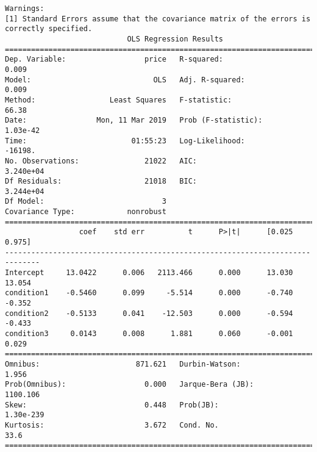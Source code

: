 \documentclass[11pt]{article}
\begin{document}
\begin{Verbatim}[commandchars=\\\{\}]
Warnings:
[1] Standard Errors assume that the covariance matrix of the errors is correctly specified.
                            OLS Regression Results                            
==============================================================================
Dep. Variable:                  price   R-squared:                       0.009
Model:                            OLS   Adj. R-squared:                  0.009
Method:                 Least Squares   F-statistic:                     66.38
Date:                Mon, 11 Mar 2019   Prob (F-statistic):           1.03e-42
Time:                        01:55:23   Log-Likelihood:                -16198.
No. Observations:               21022   AIC:                         3.240e+04
Df Residuals:                   21018   BIC:                         3.244e+04
Df Model:                           3                                         
Covariance Type:            nonrobust                                         
==============================================================================
                 coef    std err          t      P>|t|      [0.025      0.975]
------------------------------------------------------------------------------
Intercept     13.0422      0.006   2113.466      0.000      13.030      13.054
condition1    -0.5460      0.099     -5.514      0.000      -0.740      -0.352
condition2    -0.5133      0.041    -12.503      0.000      -0.594      -0.433
condition3     0.0143      0.008      1.881      0.060      -0.001       0.029
==============================================================================
Omnibus:                      871.621   Durbin-Watson:                   1.956
Prob(Omnibus):                  0.000   Jarque-Bera (JB):             1100.106
Skew:                           0.448   Prob(JB):                    1.30e-239
Kurtosis:                       3.672   Cond. No.                         33.6
==============================================================================


\end{Verbatim}
\end{document}
